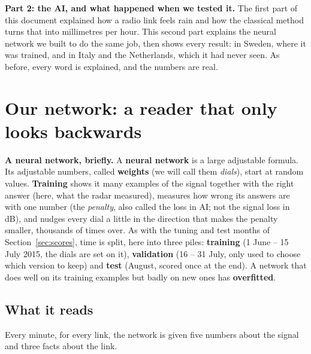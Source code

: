 
\clearpage
\begin{center}
\begin{minipage}{0.86\textwidth}
\small
\textbf{Part 2: the AI, and what happened when we tested it.} The first part of this document explained how a
radio link feels rain and how the classical method turns that into millimetres per hour. This second part explains
the neural network we built to do the same job, then shows every result: in Sweden, where it was trained, and in Italy and the Netherlands, which it had never seen. As before,
every word is explained, and the numbers are real.
\end{minipage}
\end{center}

\section{Our network: a reader that only looks backwards}
\label{sec:tcn}

\textbf{A neural network, briefly.} A \textbf{neural network} is a large adjustable formula. Its adjustable numbers, called
\textbf{weights} (we will call them \emph{dials}), start at random values. \textbf{Training} shows it many examples of
the signal together with the right answer (here, what the radar measured), measures how wrong its answers are with one
number (the \emph{penalty}, also called the loss in AI; not the signal loss in dB), and nudges every dial a little in the
direction that makes the penalty smaller, thousands of times over. As with the tuning and test months of Section~\ref{sec:scores}, time is split, here into three piles:
\textbf{training} (1 June -- 15 July 2015, the dials are set on it), \textbf{validation} (16 -- 31 July, only used to
choose which version to keep) and \textbf{test} (August, scored once at the end). A network that does well on its
training examples but badly on new ones has \textbf{overfitted}.

\subsection{What it reads}
Every minute, for every link, the network is given five numbers about the signal and three facts about the link.

